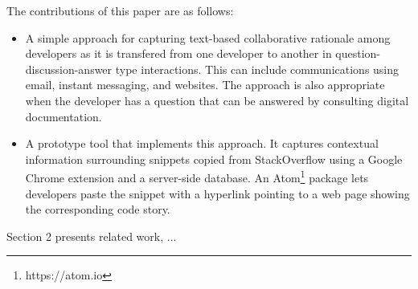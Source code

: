 \documentclass[../manifest.tex]{subfiles}
\begin{document}
The contributions of this paper are as follows:
\begin{itemize}
  \item A simple approach for capturing text-based collaborative rationale among
  developers as it is transfered from one developer to another in question-discussion-answer
  type interactions. This can include communications using email, instant messaging, and
  websites. The approach is also appropriate when the developer has a question
  that can be answered by consulting digital documentation.
  \item A prototype tool that implements this approach. It captures contextual
  information surrounding snippets copied from StackOverflow using a Google Chrome extension and a server-side database. An Atom\footnote{https://atom.io} package lets developers paste the snippet with a hyperlink pointing to a web page showing the corresponding code story.
\end{itemize}

Section 2 presents related work, ...
\end{document}
